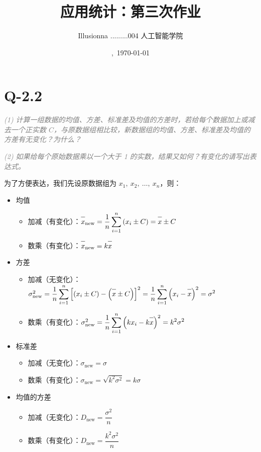 \documentclass{article}
\title{\vspace{-3em}应用统计：第三次作业}
\author{Illusionna \quad 2025.........004 \quad 人工智能学院}
\date{\currenttime,\ \today}
\newcommand{\barline}[1]{\overline{#1\rule{0pt}{1.9ex}}}
\begin{document}
\maketitle\vspace*{-1.5em}



\section{Q-2.2}
\textit{\textcolor{gray}{(1) 计算一组数据的均值、方差、标准差及均值的方差时，若给每个数据加上或减去一个正实数 $C$，与原数据组相比较，新数据组的均值、方差、标准差及均值的方差有无变化？为什么？}}

\textit{\textcolor{gray}{(2) 如果给每个原始数据乘以一个大于 1 的实数，结果又如何？有变化的请写出表达式。}}

为了方便表达，我们先设原数据组为 $x_1,\ x_2,\ \ldots,\ x_n$，则：

\begin{itemize}
    \item 均值
    \begin{itemize}
        \item 加减（有变化）：$\barline{x}_{\text{new}}=\dfrac{1}{n}\displaystyle\sum\limits_{i=1}^{n}\left(x_i\pm C\right)=\barline{x}\pm C$
        \item 数乘（有变化）：$\barline{x}_{\text{new}}=k\barline{x}$
    \end{itemize}
    \item 方差
    \begin{itemize}
        \item 加减（无变化）：$\sigma_{\text{new}}^2=\dfrac{1}{n}\displaystyle\sum\limits_{i=1}^{n}\left[\left(x_i\pm C\right)-\left(\barline{x}\pm C\right)\right]^2=\dfrac{1}{n}\displaystyle\sum\limits_{i=1}^{n}\left(x_i-\barline{x}\right)^2=\sigma^2$
        \item 数乘（有变化）：$\sigma_{\text{new}}^2=\dfrac{1}{n}\displaystyle\sum\limits_{i=1}^{n}\left(kx_i-k\barline{x}\right)^2=k^2\sigma^2$
    \end{itemize}
    \item 标准差
    \begin{itemize}
        \item 加减（无变化）：$\sigma_{\text{new}}=\sigma$
        \item 数乘（有变化）：$\sigma_{\text{new}}=\displaystyle\sqrt{\displaystyle k^2\sigma^2}=k\sigma$
    \end{itemize}
    \item 均值的方差
    \begin{itemize}
        \item 加减（无变化）：$D_{\text{new}}=\dfrac{\sigma^2}{n}$
        \item 数乘（有变化）：$D_{\text{new}}=\dfrac{k^2\sigma^2}{n}$
    \end{itemize}
\end{itemize}
\end{document}

